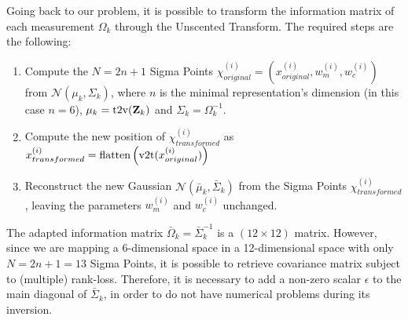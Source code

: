 Going back to our problem, it is possible to transform the information matrix of each measurement $\Omega_k$ through the Unscented Transform. The required steps are the following:

\begin{enumerate}
    \item Compute the $N = 2n+1$ Sigma Points $\chi_{original}^{(i)} = (x_{original}^{(i)}, w_m^{(i)}, w_c^{(i)})$ from $\mathcal{N}(\mu_k, \Sigma_k)$, where $n$ is the minimal representation's dimension (in this case $n = 6$), $\mu_k = \text{t2v}(\mathbf{Z}_{k})$ and $\Sigma_k = \Omega_k^{-1}$.
    \item Compute the new position of $\chi_{transformed}^{(i)}$ as $x_{transformed}^{(i)} = \flatten{\v2t(x_{original}^{(i)})}$
    \item Reconstruct the new Gaussian $\mathcal{N}(\bar{\mu}_k, \bar{\Sigma}_k)$ from the Sigma Points $\chi_{transformed}^{(i)}$, leaving the parameters $w_m^{(i)}$ and $w_c^{(i)}$ unchanged.
\end{enumerate}

The adapted information matrix $\bar{\Omega}_k = \bar{\Sigma}_k^{-1}$ is a $(12\times12)$ matrix. However, since we are mapping a 6-dimensional space in a 12-dimensional space with only $N = 2n + 1 = 13$ Sigma Points, it is possible to retrieve covariance matrix subject to (multiple) rank-loss. Therefore, it is necessary to add a non-zero scalar $\epsilon$ to the main diagonal of $\bar{\Sigma}_k$, in order to do not have numerical problems during its inversion.

